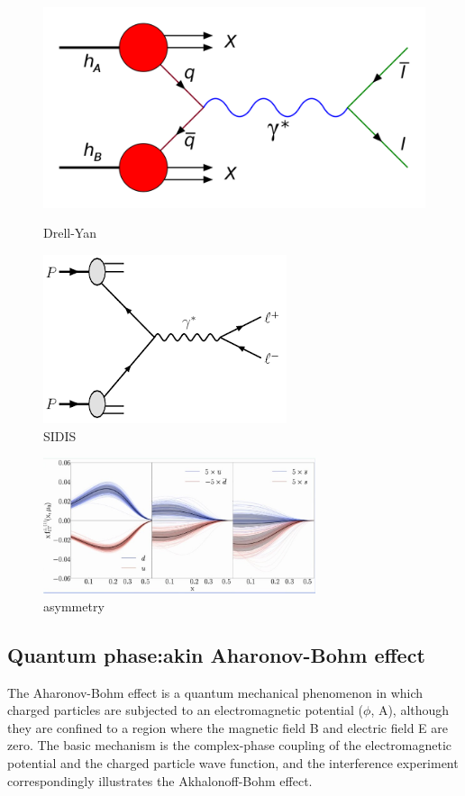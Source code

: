 \documentclass[12pt, a4paper, oneside]{article}
\begin{document}
\begin{spacing}{2.0}
\begin{figure}
    \begin{minipage}[t]{0.5\linewidth}
        \centering
        \includegraphics[scale=0.1]{drellyan.png}
        \caption{Drell-Yan}
        \label{fig:side:a}
      \end{minipage}%
      \begin{minipage}[t]{0.5\linewidth}
        \centering
        \includegraphics[scale=0.3]{SIDIS.png}
        \caption{SIDIS}
        \label{fig:side:b}
      \end{minipage}
\end{figure}
\begin{figure}
    \centering
    \includegraphics[width=8cm]{theta.jpg}
    \caption{asymmetry}
\end{figure}


\subsection{Quantum phase:akin Aharonov-Bohm effect}
The Aharonov-Bohm effect is a quantum mechanical phenomenon in which charged particles are subjected to an electromagnetic potential ($\phi$, A), although they are confined to a region where the magnetic field B and electric field E are zero.
The basic mechanism is the complex-phase coupling of the electromagnetic potential and the charged particle wave function, and the interference experiment correspondingly illustrates the Akhalonoff-Bohm effect.


\end{spacing}
\end{document}
